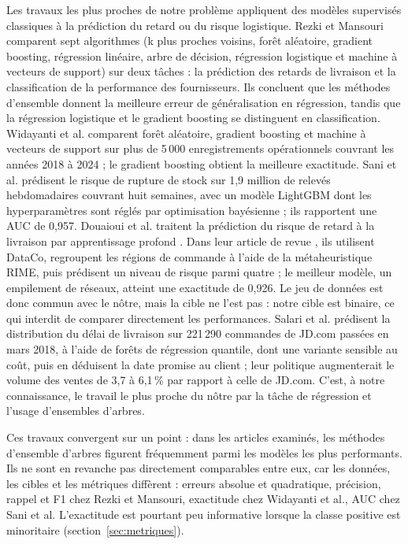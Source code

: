 \documentclass[11pt,a4paper]{article}
\theoremstyle{definition}
\begin{document}
Les travaux les plus proches de notre problème appliquent des modèles supervisés classiques à la prédiction du retard ou du risque logistique. Rezki et Mansouri \cite{rezki2024machine} comparent sept algorithmes (k plus proches voisins, forêt aléatoire, gradient boosting, régression linéaire, arbre de décision, régression logistique et machine à vecteurs de support) sur deux tâches : la prédiction des retards de livraison et la classification de la performance des fournisseurs. Ils concluent que les méthodes d'ensemble donnent la meilleure erreur de généralisation en régression, tandis que la régression logistique et le gradient boosting se distinguent en classification. Widayanti et al. \cite{widayanti2026predicting} comparent forêt aléatoire, gradient boosting et machine à vecteurs de support sur plus de 5\,000 enregistrements opérationnels couvrant les années 2018 à 2024 ; le gradient boosting obtient la meilleure exactitude. Sani et al. \cite{sani2023supply} prédisent le risque de rupture de stock sur 1,9 million de relevés hebdomadaires couvrant huit semaines, avec un modèle LightGBM dont les hyperparamètres sont réglés par optimisation bayésienne ; ils rapportent une AUC de 0,957. Douaioui et al. traitent la prédiction du risque de retard à la livraison par apprentissage profond \cite{douaioui2024deep,douaioui2024enhancing}. Dans leur article de revue \cite{douaioui2024enhancing}, ils utilisent DataCo, regroupent les régions de commande à l'aide de la métaheuristique RIME, puis prédisent un niveau de risque parmi quatre ; le meilleur modèle, un empilement de réseaux, atteint une exactitude de 0,926. Le jeu de données est donc commun avec le nôtre, mais la cible ne l'est pas : notre cible est binaire, ce qui interdit de comparer directement les performances. Salari et al. \cite{salari2022realtime} prédisent la distribution du délai de livraison sur 221\,290 commandes de JD.com passées en mars 2018, à l'aide de forêts de régression quantile, dont une variante sensible au coût, puis en déduisent la date promise au client ; leur politique augmenterait le volume des ventes de 3,7 à 6,1\,\% par rapport à celle de JD.com. C'est, à notre connaissance, le travail le plus proche du nôtre par la tâche de régression et l'usage d'ensembles d'arbres.

Ces travaux convergent sur un point : dans les articles examinés, les méthodes d'ensemble d'arbres figurent fréquemment parmi les modèles les plus performants. Ils ne sont en revanche pas directement comparables entre eux, car les données, les cibles et les métriques diffèrent : erreurs absolue et quadratique, précision, rappel et F1 chez Rezki et Mansouri, exactitude chez Widayanti et al., AUC chez Sani et al. L'exactitude est pourtant peu informative lorsque la classe positive est minoritaire (section~\ref{sec:metriques}).
\end{document}
